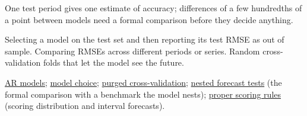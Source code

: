 \begin{qfmethod}
 One test period gives one estimate of accuracy; differences of a few hundredths of a point between models need a formal comparison before they decide anything.

 Selecting a model on the test set and then reporting its test RMSE as out of sample. Comparing RMSEs across different periods or series. Random cross-validation folds that let the model see the future.

 \hyperref[meth:autoregressive-forecasting]{AR models}; \hyperref[meth:time-series-model-selection]{model choice}; \hyperref[meth:purged-embargoed-cross-validation]{purged cross-validation}; \hyperref[meth:nested-forecast-tests]{nested forecast tests} (the formal comparison with a benchmark the model nests); \hyperref[meth:proper-scoring-rules]{proper scoring rules} (scoring distribution and interval forecasts).

\end{qfmethod}

